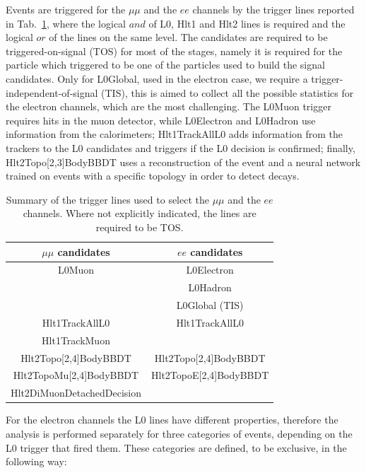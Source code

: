 Events are triggered for the $\mu\mu$ and the $ee$ channels by the trigger lines
reported in Tab.~\ref{triglines}, where the logical $and$ of L0, Hlt1 and Hlt2
lines is required and the logical $or$ of the lines on the same level. The candidates are
required to be triggered-on-signal (TOS) for most of the stages, namely
it is required for the particle which triggered to be one of the particles used to build the signal candidates.
Only for L0Global, used in the electron case, we require a trigger-independent-of-signal (TIS),
this is aimed to collect all the possible statistics for the electron channels, which are the most challenging.
The L0Muon trigger requires hits in the muon detector, while L0Electron and L0Hadron use information
from the calorimeters; Hlt1TrackAllL0 adds information from the trackers to the L0 candidates and
triggers if the L0 decision is confirmed;
finally, Hlt2Topo[2,3]BodyBBDT uses a reconstruction of the event and a neural network
trained on events with a specific topology in order to detect decays.

\begin{table}[h!]
\label{triglines}
\begin{center}
\caption{Summary of the trigger lines used to select the $\mu\mu$ and the $ee$ channels.
Where not explicitly indicated, the lines are required to be TOS.}
\begin{tabular}{c|c}

$\mu\mu$ candidates &  $ee$ candidates \\
\hline
	L0Muon		& L0Electron\\
				& L0Hadron\\
				& L0Global (TIS)\\
\hline
	Hlt1TrackAllL0				& Hlt1TrackAllL0 \\
	Hlt1TrackMuon				&	 \\
\hline
	Hlt2Topo[2,4]BodyBBDT 		& Hlt2Topo[2,4]BodyBBDT \\
	Hlt2TopoMu[2,4]BodyBBDT 	& Hlt2TopoE[2,4]BodyBBDT \\
	Hlt2DiMuonDetachedDecision	&							\\
\end{tabular}
\end{center}
\end{table}

For the electron channels the L0 lines
have different properties, therefore the analysis is performed separately for three categories
of events, depending on the L0 trigger that fired them. These categories are defined,
to be exclusive, in the following way:

